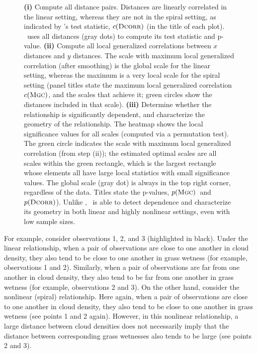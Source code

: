 \documentclass[11pt]{article}
\begin{document}
\begin{figure}
{%
\textbf{(i)} Compute all distance pairs. Distances are linearly correlated in the linear setting, whereas they are not in the spiral setting, as indicated by \Dcorr's test statistic, $c({\normalfont\textsc{Dcorr}})$ (in the title of each plot).  \Dcorr~uses all distances (gray dots) to compute its test statistic and p-value.
% 
\textbf{(ii)} Compute all local generalized correlations between $x$ distances and $y$ distances.  The scale with maximum local generalized correlation (after smoothing) is the global scale for the linear setting, whereas the maximum is a very local scale for the spiral setting (panel titles state the maximum local generalized correlation $c({\normalfont\textsc{Mgc}})$, and the scales that achieve it; green circles show the distances included in that scale).
\textbf{(iii)} 
Determine whether the relationship is significantly dependent, and characterize the geometry of the relationship.  
The heatmap shows the local  significance values for all scales (computed via a permutation test). The green circle indicates the scale with maximum local generalized correlation (from step (ii));  the estimated optimal scales are all scales within the green rectangle, which is the largest rectangle whose elements all have large local statistics with small significance values. The global scale (gray dot) is always in the top right corner, regardless of the data. 
Titles state the p-values,  $p({\normalfont\textsc{Mgc}})$~and $p({\normalfont\textsc{Dcorr}})$).
Unlike \Dcorr, \Mgc~is able to detect dependence and characterize its geometry in both linear and highly nonlinear settings, even with low sample sizes.}
\label{f:newschem}
\end{figure}


For example, consider observations  1, 2, and 3 (highlighted in black).  Under the linear relationship, when a pair of observations are close to one another in cloud density, they  also tend to be close to one another in grass wetness (for example, observations 1 and 2).
Similarly, 
when a pair of observations are far from one another in cloud density, they also tend to be far from one another in grass wetness (for example, observations 2 and 3).  
On the other hand, consider the nonlinear (spiral) relationship.  Here again, when a pair of observations are close to one another in cloud density, they also tend to be close to one another in grass wetness (see points 1 and 2 again).  However, in this nonlinear relationship,  a large distance between cloud densities does not necessarily imply that the distance between corresponding grass wetnesses also tends to be large (see points 2 and 3).
% 
\end{document}
